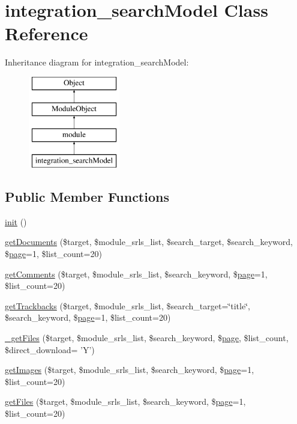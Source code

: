 \hypertarget{classintegration__searchModel}{\section{integration\-\_\-search\-Model Class Reference}
\label{classintegration__searchModel}
}
Inheritance diagram for integration\-\_\-search\-Model\-:\begin{figure}[H]
\begin{center}
\leavevmode
\includegraphics[height=4.000000cm]{classintegration__searchModel}
\end{center}
\end{figure}
\subsection*{Public Member Functions}
\begin{DoxyCompactItemize}
\item 
\hyperlink{classintegration__searchModel_a77ba2cc52ea9843a6812274785a9393f}{init} ()
\item 
\hyperlink{classintegration__searchModel_ac5879957a3ab4f84fb0d6341ca109d8b}{get\-Documents} (\$target, \$module\-\_\-srls\-\_\-list, \$search\-\_\-target, \$search\-\_\-keyword, \$\hyperlink{classpage}{page}=1, \$list\-\_\-count=20)
\item 
\hyperlink{classintegration__searchModel_a4c3399ca8e295b6f427df69e5b417343}{get\-Comments} (\$target, \$module\-\_\-srls\-\_\-list, \$search\-\_\-keyword, \$\hyperlink{classpage}{page}=1, \$list\-\_\-count=20)
\item 
\hyperlink{classintegration__searchModel_a2426cde11df714af3ff96d83366f9752}{get\-Trackbacks} (\$target, \$module\-\_\-srls\-\_\-list, \$search\-\_\-target=\char`\"{}title\char`\"{}, \$search\-\_\-keyword, \$\hyperlink{classpage}{page}=1, \$list\-\_\-count=20)
\item 
\hyperlink{classintegration__searchModel_a880b8ccc0978216ae3d8da0e361b4764}{\-\_\-get\-Files} (\$target, \$module\-\_\-srls\-\_\-list, \$search\-\_\-keyword, \$\hyperlink{classpage}{page}, \$list\-\_\-count, \$direct\-\_\-download= 'Y')
\item 
\hyperlink{classintegration__searchModel_ad46ab3c6bb406037c82feeb554a89b05}{get\-Images} (\$target, \$module\-\_\-srls\-\_\-list, \$search\-\_\-keyword, \$\hyperlink{classpage}{page}=1, \$list\-\_\-count=20)
\item 
\hyperlink{classintegration__searchModel_ad2aca662d598b44aa69c228f2b588a61}{get\-Files} (\$target, \$module\-\_\-srls\-\_\-list, \$search\-\_\-keyword, \$\hyperlink{classpage}{page}=1, \$list\-\_\-count=20)
\end{DoxyCompactItemize}
